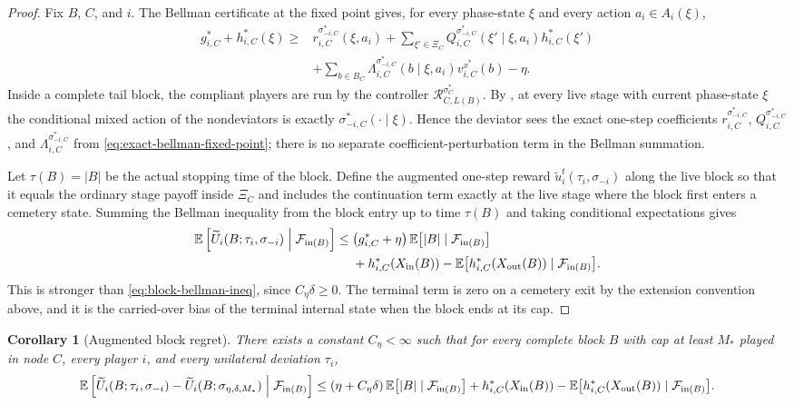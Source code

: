 \documentclass[12pt]{article}
\newtheorem{corollary}[theorem]{Corollary}
\theoremstyle{definition}
\newcommand{\E}{\mathbb{E}}
\newcommand{\1}{\mathbf{1}}
\newcommand{\cF}{\mathcal{F}}
\begin{document}
\begin{proof}
Fix $B$, $C$, and $i$. The Bellman certificate at the fixed point gives, for every
phase-state $\xi$ and every action $a_i\in A_i(\xi)$,
\begin{align}
\label{eq:exact-bellman-fixed-point}
g_{i,C}^* + h_{i,C}^*(\xi)
\ge {}
&r_{i,C}^{\sigma_{-i,C}^*}(\xi,a_i)
+
\sum_{\xi'\in\Xi_C}Q_{i,C}^{\sigma_{-i,C}^*}(\xi'\mid\xi,a_i)h_{i,C}^*(\xi')
\\
&+
\sum_{b\in B_C}\Lambda_{i,C}^{\sigma_{-i,C}^*}(b\mid\xi,a_i)v_{i,C}^{x^*}(b)
-\eta.
\nonumber
\end{align}
Inside a complete tail block, the compliant players are run by the controller
$\mathcal R_{C,L(B)}^{\sigma_C^*}$. By , at every live
stage with current phase-state $\xi$ the conditional mixed action of the
nondeviators is exactly $\sigma_{-i,C}^*(\cdot\mid\xi)$. Hence the deviator sees
the exact one-step coefficients
$r_{i,C}^{\sigma_{-i,C}^*}$, $Q_{i,C}^{\sigma_{-i,C}^*}$, and
$\Lambda_{i,C}^{\sigma_{-i,C}^*}$ from
\eqref{eq:exact-bellman-fixed-point}; there is no separate coefficient-perturbation
term in the Bellman summation.

Let $\tau(B)=|B|$ be the actual stopping time of the block. Define the augmented
one-step reward $\widetilde u_i^t(\tau_i,\sigma_{-i})$ along the live block so that
it equals the ordinary stage payoff inside $\Xi_C$ and includes the continuation
term exactly at the live stage where the block first enters a cemetery state.
Summing the Bellman inequality from the block entry up to time $\tau(B)$ and
taking conditional expectations gives
\begin{align*}
\E\left[\widetilde U_i(B;\tau_i,\sigma_{-i})\Bigm|\cF_{\mathrm{in}(B)}\right]
\le{}&
\bigl(g_{i,C}^*+\eta\bigr)\,
\E\bigl[|B|\mid\cF_{\mathrm{in}(B)}\bigr]
\\
&+
h_{i,C}^*(X_{\mathrm{in}}(B))
-
\E\bigl[h_{i,C}^*(X_{\mathrm{out}}(B))\mid\cF_{\mathrm{in}(B)}\bigr].
\end{align*}
This is stronger than \eqref{eq:block-bellman-ineq}, since $C_\eta\delta\ge 0$.
The terminal term is zero on a cemetery exit by the extension convention above,
and it is the carried-over bias of the terminal internal state when the block ends
at its cap.
\end{proof}

\begin{corollary}[Augmented block regret]
\label{cor:block-regret}
There exists a constant $C_\eta<\infty$ such that for every complete block $B$
with cap at least $M_*$ played in node $C$, every player $i$, and every unilateral
deviation $\tau_i$,
\begin{equation}
\label{eq:block-regret-ineq}
\E\left[
\widetilde U_i(B;\tau_i,\sigma_{-i})-\widetilde U_i(B;\sigma_{\eta,\delta,M_*})
\Bigm|\cF_{\mathrm{in}(B)}
\right]
\le
(\eta+C_\eta\delta)\,\E\bigl[|B|\mid\cF_{\mathrm{in}(B)}\bigr]
+
h_{i,C}^*(X_{\mathrm{in}}(B))
-
\E\bigl[h_{i,C}^*(X_{\mathrm{out}}(B))\mid\cF_{\mathrm{in}(B)}\bigr].
\end{equation}
\end{corollary}
\end{document}
